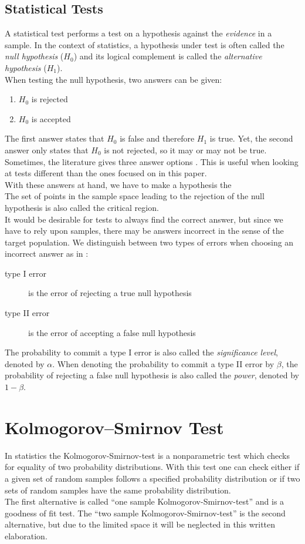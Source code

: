\documentclass{article}
\begin{document}
\subsection{Statistical Tests}
A statistical test performs a test on a hypothesis against the \emph{evidence} in a sample.
In the context of statistics, a hypothesis under test is often called the \emph{null hypothesis} ($H_0$) and its logical complement is called the \emph{alternative hypothesis} ($H_1$).
\\
When testing the null hypothesis, two answers can be given:
\begin{enumerate}
	\item $H_0$ is rejected
	\item $H_0$ is accepted
\end{enumerate}
The first answer states that $H_0$ is false and therefore $H_1$ is true.
Yet, the second answer only states that $H_0$ is not rejected, so it may or may not be true.
Sometimes, the literature gives three answer options \cite{weigand2009statistik}.
This is useful when looking at tests different than the ones focused on in this paper.
\\
With these answers at hand, we have to make a hypothesis the 
\\
The set of points in the sample space leading to the rejection of the null hypothesis is also called the critical region.
\\
It would be desirable for tests to always find the correct answer, but since we have to rely upon samples, there may be answers incorrect in the sense of the target population.
We distinguish between two types of errors when choosing an incorrect answer as in \cite{conover1980practical}:
\begin{description}
	\item[type I error] is the error of rejecting a true null hypothesis
	\item[type II error] is the error of accepting a false null hypothesis
\end{description}
The probability to commit a type I error is also called the \emph{significance level}, denoted by $\alpha$.
When denoting the probability to commit a type II error by $\beta$, the probability of rejecting a false null hypothesis is also called the \emph{power}, denoted by $1-\beta$.



\section{Kolmogorov–Smirnov Test}
In statistics the Kolmogorov-Smirnov-test is a nonparametric test which checks for equality of two probability distributions.
With this test one can check either if a given set of random samples follows a specified probability distribution or if two sets of random samples have the same probability distribution.\\
The first alternative is called ``one sample Kolmogorov-Smirnov-test'' and is a goodness of fit test. The ``two sample  Kolmogorov-Smirnov-test'' is the second alternative, but due to the limited space it will be neglected in this written elaboration.
\end{document}
